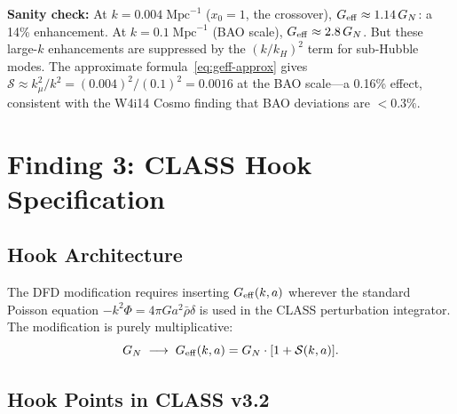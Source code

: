 \documentclass[11pt]{article}
\theoremstyle{definition}
\theoremstyle{remark}
\newcommand{\Geff}{G_{\rm eff}}
\begin{document}
\textbf{Sanity check:} At $k = 0.004\;\text{Mpc}^{-1}$ ($x_0 = 1$,
the crossover), $\Geff \approx 1.14\, G_N$: a 14\% enhancement.
At $k = 0.1\;\text{Mpc}^{-1}$ (BAO scale), $\Geff \approx 2.8\, G_N$.
But these large-$k$ enhancements are suppressed by the $(k/k_H)^2$ term
for sub-Hubble modes. The approximate formula~\eqref{eq:geff-approx}
gives $\mathcal{S} \approx k_\mu^2/k^2 = (0.004)^2/(0.1)^2 = 0.0016$
at the BAO scale---a 0.16\% effect, consistent with the W4i14 Cosmo
finding that BAO deviations are $< 0.3\%$.


\section{Finding 3: CLASS Hook Specification}
\label{sec:class-hooks}

\subsection{Hook Architecture}

The DFD modification requires inserting $\Geff(k,a)$ wherever the
standard Poisson equation $-k^2\Phi = 4\pi G a^2 \bar\rho \delta$ is
used in the CLASS perturbation integrator. The modification is purely
multiplicative:
\begin{equation}
  G_N \;\longrightarrow\; G_{\rm eff}(k,a) = G_N \cdot [1 + \mathcal{S}(k,a)].
\end{equation}

\subsection{Hook Points in CLASS v3.2}
\end{document}
